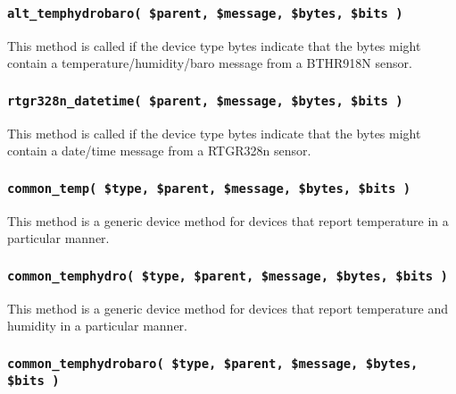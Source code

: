 \subsubsection*{\texttt{alt\_temphydrobaro( \$parent, \$message, \$bytes, \$bits )}\label{xPL::RF::Oregon_alt_temphydrobaro_parent_message_bytes_bits_}}


This method is called if the device type bytes indicate that the bytes
might contain a temperature/humidity/baro message from a BTHR918N sensor.

\subsubsection*{\texttt{rtgr328n\_datetime( \$parent, \$message, \$bytes, \$bits )}\label{xPL::RF::Oregon_rtgr328n_datetime_parent_message_bytes_bits_}}


This method is called if the device type bytes indicate that the bytes
might contain a date/time message from a RTGR328n sensor.

\subsubsection*{\texttt{common\_temp( \$type, \$parent, \$message, \$bytes, \$bits )}\label{xPL::RF::Oregon_common_temp_type_parent_message_bytes_bits_}}


This method is a generic device method for devices that report
temperature in a particular manner.

\subsubsection*{\texttt{common\_temphydro( \$type, \$parent, \$message, \$bytes, \$bits )}\label{xPL::RF::Oregon_common_temphydro_type_parent_message_bytes_bits_}}


This method is a generic device method for devices that report
temperature and humidity in a particular manner.

\subsubsection*{\texttt{common\_temphydrobaro( \$type, \$parent, \$message, \$bytes, \$bits )}\label{xPL::RF::Oregon_common_temphydrobaro_type_parent_message_bytes_bits_}}


